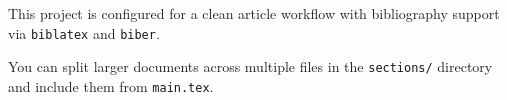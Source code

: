 This project is configured for a clean article workflow with bibliography support via
\texttt{biblatex} and \texttt{biber}.

You can split larger documents across multiple files in the \texttt{sections/}
directory and include them from \texttt{main.tex}.
